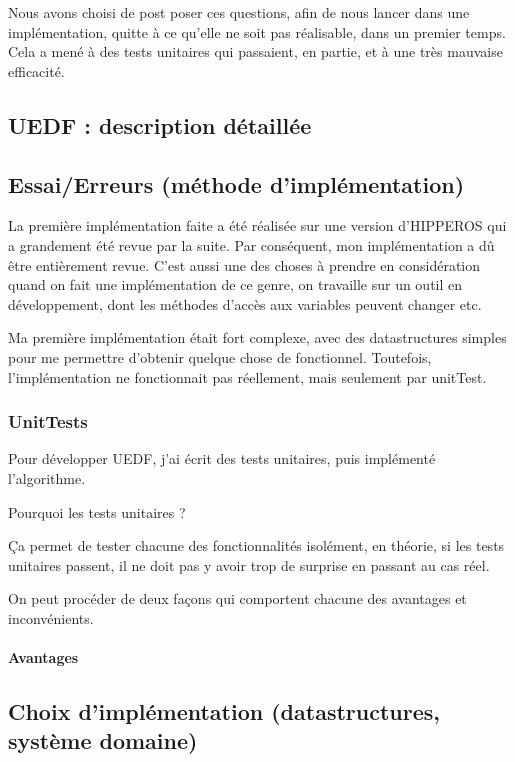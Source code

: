 	Nous avons choisi de post poser ces questions, afin de nous lancer dans une implémentation, quitte à 
	ce qu'elle ne soit pas réalisable, dans un premier temps. Cela a mené à des tests unitaires qui 
	passaient, en partie, et à une très mauvaise efficacité. 
	
	
	\subsection{UEDF : description détaillée}
	
	
	
	\subsection{Essai/Erreurs (méthode d'implémentation)}
	La première implémentation faite a été réalisée sur une version d'HIPPEROS qui a grandement été revue par la suite. Par conséquent, mon implémentation a dû être entièrement revue. C'est aussi une des choses à prendre en
	 considération quand on fait une implémentation de ce genre, on travaille sur un outil en développement, 
	 dont les méthodes d'accès aux variables peuvent changer etc.
	 
	 Ma première implémentation était fort complexe, avec des datastructures simples pour me permettre d'obtenir
	 quelque chose de fonctionnel. Toutefois, l'implémentation ne fonctionnait pas réellement, 
	 mais seulement par unitTest.
	 
	 \subsubsection{UnitTests}
	 Pour développer UEDF, j'ai écrit des tests unitaires, puis implémenté l'algorithme. 
	 
	 Pourquoi les tests unitaires ?
	 
	 Ça permet de tester chacune des fonctionnalités isolément, en théorie, si les tests unitaires passent, 
	 il ne doit pas y avoir trop de surprise en passant au cas réel.
	 
	 On peut procéder de deux façons qui comportent chacune des avantages et inconvénients.
	 
	 \paragraph{Avantages} 
	
	\subsection{Choix d'implémentation (datastructures, système domaine)}
